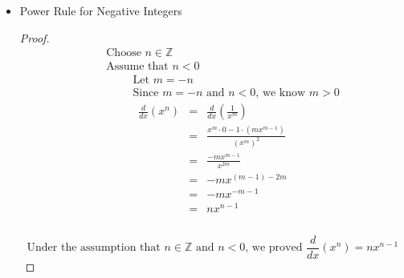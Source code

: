 \documentclass{article}
\begin{document}
\begin{itemize}
    \item Power Rule for Negative Integers
    \begin{proof}
        \begin{align*}
            &\quad \text{Choose } n \in \mathbb{Z} \\
            &\quad \text{Assume that } n < 0 \\
            &\quad \hspace{1cm} \text{Let } m = -n \\
            &\quad \hspace{1cm} \text{Since } m = -n \text{ and } n < 0 \text{, we know } m > 0
        \end{align*}
        \begin{eqnarray}
            \frac{d}{dx}\left(x^n\right) &=& \frac{d}{dx}\left(\frac{1}{x^m}\right) \\
                                         &=& \frac{x^m \cdot 0 - 1 \cdot (mx^{m - 1})}{(x^m)^2} \\
                                         &=& \frac{-mx^{m - 1}}{x^{2m}} \\
                                         &=& -mx^{(m - 1) - 2m} \\
                                         &=& -mx^{- m - 1} \\
                                         &=& nx^{n - 1} \\
        \end{eqnarray} \\
        $$\text{Under the assumption that } n \in \mathbb{Z} \text{ and } n < 0 \text{, we proved } \frac{d}{dx}\left(x^n\right) = nx^{n - 1}$$
    \end{proof}
\end{itemize}
\end{document}
